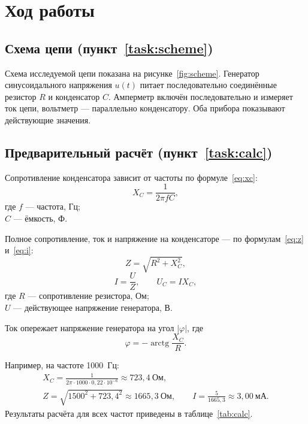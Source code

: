 \section{Ход работы}

\subsection{Схема цепи (пункт~\ref{task:scheme})}
Схема исследуемой цепи показана на рисунке~\ref{fig:scheme}. Генератор синусоидального
напряжения $u(t)$ питает последовательно соединённые резистор $R$ и конденсатор $C$.
Амперметр включён последовательно и измеряет ток цепи, вольтметр — параллельно
конденсатору. Оба прибора показывают действующие значения.


\subsection{Предварительный расчёт (пункт~\ref{task:calc})}
Сопротивление конденсатора зависит от частоты по формуле~\eqref{eq:xc}:
\begin{equation}\label{eq:xc}
  X_C = \frac{1}{2\pi f C},
\end{equation}
где $f$ — частота, Гц;\\
$C$ — ёмкость, Ф.

Полное сопротивление, ток и напряжение на конденсаторе — по формулам~\eqref{eq:z}
и~\eqref{eq:i}:
\begin{equation}\label{eq:z}
  Z = \sqrt{R^2 + X_C^2},
\end{equation}
\begin{equation}\label{eq:i}
  I = \frac{U}{Z}, \qquad U_C = I X_C,
\end{equation}
где $R$ — сопротивление резистора, Ом;\\
$U$ — действующее напряжение генератора, В.

Ток опережает напряжение генератора на угол $|\varphi|$, где
\[
  \varphi = -\operatorname{arctg} \frac{X_C}{R}.
\]

Например, на частоте 1000~Гц:
\begin{gather*}
  X_C = \frac{1}{2\pi \cdot 1000 \cdot 0{,}22 \cdot 10^{-6}} \approx 723{,}4~\text{Ом}, \\
  Z = \sqrt{1500^2 + 723{,}4^2} \approx 1665{,}3~\text{Ом}, \qquad
  I = \frac{5}{1665{,}3} \approx 3{,}00~\text{мА}.
\end{gather*}
Результаты расчёта для всех частот приведены в таблице~\ref{tab:calc}.

